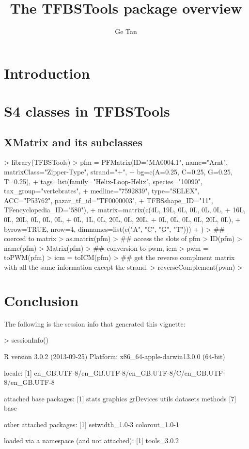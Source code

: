 \documentclass{article}
\title{The \textbf{TFBSTools} package overview}
\author{Ge Tan}
\begin{document}

\maketitle

\tableofcontents

\section{Introduction}


\section{S4 classes in TFBSTools}

\subsection{XMatrix and its subclasses}
\begin{Schunk}
\begin{Sinput}
> library(TFBSTools)
> pfm = PFMatrix(ID="MA0004.1", name="Arnt", matrixClass="Zipper-Type", strand="+",
+         bg=c(A=0.25, C=0.25, G=0.25, T=0.25),
+         tags=list(family="Helix-Loop-Helix", species="10090", tax_group="vertebrates",
+         medline="7592839", type="SELEX", ACC="P53762", pazar_tf_id="TF0000003",
+         TFBSshape_ID="11", TFencyclopedia_ID="580"),
+         matrix=matrix(c(4L,  19L, 0L,  0L,  0L,  0L,
+                 16L, 0L,  20L, 0L,  0L,  0L,
+                 0L,  1L,  0L,  20L, 0L,  20L,
+                 0L,  0L,  0L,  0L,  20L, 0L),
+                 byrow=TRUE, nrow=4, dimnames=list(c("A", "C", "G", "T")))
+         )
> ## coerced to matrix
> as.matrix(pfm)
> ## access the slots of pfm
> ID(pfm)
> name(pfm)
> Matrix(pfm)
> ## conversion to pwm, icm
> pwm = toPWM(pfm)
> icm = toICM(pfm)
> ## get the reverse complment matrix with all the same information except the strand.
> reverseComplement(pwm)
> 
\end{Sinput}
\end{Schunk}


\section{Conclusion}
The following is the session info that generated this vignette:
\begin{Schunk}
\begin{Sinput}
>   sessionInfo()
\end{Sinput}
\begin{Soutput}
R version 3.0.2 (2013-09-25)
Platform: x86_64-apple-darwin13.0.0 (64-bit)

locale:
[1] en_GB.UTF-8/en_GB.UTF-8/en_GB.UTF-8/C/en_GB.UTF-8/en_GB.UTF-8

attached base packages:
[1] stats     graphics  grDevices utils     datasets  methods  
[7] base     

other attached packages:
[1] setwidth_1.0-3 colorout_1.0-1

loaded via a namespace (and not attached):
[1] tools_3.0.2
\end{Soutput}
\end{Schunk}

\newpage


\end{document}
